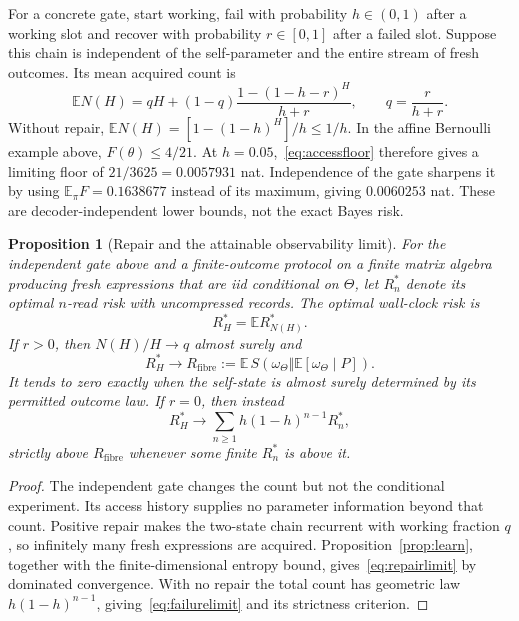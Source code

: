 \documentclass[12pt]{article}
\newtheorem{proposition}[theorem]{Proposition}
\theoremstyle{definition}
\theoremstyle{remark}
\newcommand{\E}{\mathbb E}
\begin{document}
For a concrete gate, start working, fail with probability $h\in(0,1)$ after a working slot and recover with probability $r\in[0,1]$ after a failed slot. Suppose this chain is independent of the self-parameter and the entire stream of fresh outcomes. Its mean acquired count is
\begin{equation}\label{eq:workingcount}
\E N(H)=qH+(1-q)\frac{1-(1-h-r)^H}{h+r},\qquad q=\frac r{h+r}.
\end{equation}
Without repair, $\E N(H)=[1-(1-h)^H]/h\le1/h$. In the affine Bernoulli example above, $F(\theta)\le4/21$. At $h=0.05$,~\eqref{eq:accessfloor} therefore gives a limiting floor of $21/3625=0.0057931$ nat. Independence of the gate sharpens it by using $\E_\pi F=0.1638677$ instead of its maximum, giving $0.0060253$ nat. These are decoder-independent lower bounds, not the exact Bayes risk.

\begin{proposition}[Repair and the attainable observability limit]\label{prop:repairlimit}
For the independent gate above and a finite-outcome protocol on a finite matrix algebra producing fresh expressions that are iid conditional on $\Theta$, let $R_n^*$ denote its optimal $n$-read risk with uncompressed records. The optimal wall-clock risk is
\[
R_H^*=\E R_{N(H)}^*.
\]
If $r>0$, then $N(H)/H\to q$ almost surely and
\begin{equation}\label{eq:repairlimit}
R_H^*\longrightarrow R_{\mathrm{fibre}}
:=\E\,S(\omega_\Theta\Vert\E[\omega_\Theta\mid P]).
\end{equation}
It tends to zero exactly when the self-state is almost surely determined by its permitted outcome law. If $r=0$, then instead
\begin{equation}\label{eq:failurelimit}
R_H^*\longrightarrow
\sum_{n\ge1}h(1-h)^{n-1}R_n^*,
\end{equation}
strictly above $R_{\mathrm{fibre}}$ whenever some finite $R_n^*$ is above it.
\end{proposition}

\begin{proof}
The independent gate changes the count but not the conditional experiment. Its access history supplies no parameter information beyond that count. Positive repair makes the two-state chain recurrent with working fraction $q$, so infinitely many fresh expressions are acquired. Proposition~\ref{prop:learn}, together with the finite-dimensional entropy bound, gives~\eqref{eq:repairlimit} by dominated convergence. With no repair the total count has geometric law $h(1-h)^{n-1}$, giving~\eqref{eq:failurelimit} and its strictness criterion.
\end{proof}
\end{document}
